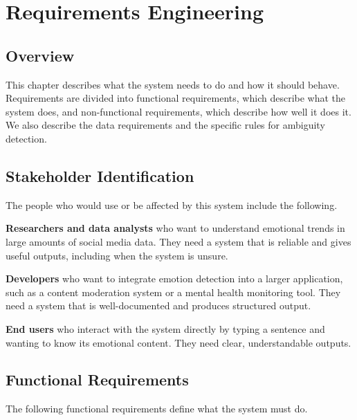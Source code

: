 \chapter{Requirements Engineering}

\section{Overview}

This chapter describes what the system needs to do and how it should behave. Requirements
are divided into functional requirements, which describe what the system does, and
non-functional requirements, which describe how well it does it. We also describe the data
requirements and the specific rules for ambiguity detection.

\section{Stakeholder Identification}

The people who would use or be affected by this system include the following.

\textbf{Researchers and data analysts} who want to understand emotional trends in large amounts
of social media data. They need a system that is reliable and gives useful outputs, including
when the system is unsure.

\textbf{Developers} who want to integrate emotion detection into a larger application, such as a
content moderation system or a mental health monitoring tool. They need a system that is
well-documented and produces structured output.

\textbf{End users} who interact with the system directly by typing a sentence and wanting to know
its emotional content. They need clear, understandable outputs.

\section{Functional Requirements}

The following functional requirements define what the system must do.

